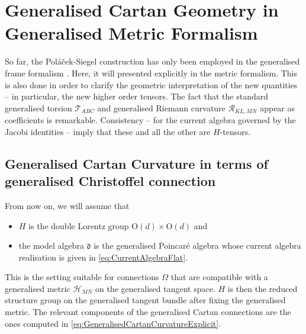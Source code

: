\documentclass[11pt,a4paper]{article}
\numberwithin{equation}{section}
\begin{document}
\section{Generalised Cartan Geometry in Generalised Metric Formalism}\label{chap:genMetricFormalism}

So far, the Poláček-Siegel construction has only been employed in the generalised frame formalism \cite{Polacek:2013nla,Butter:2021dtu,Butter:2022iza}. Here, it will presented explicitly in the metric formalism. This is also done in order to clarify the geometric interpretation of the new quantities -- in particular, the new higher order tensors. The fact that the standard generalised torsion $\mathcal{T}_{ABC}$ and generalised Riemann curvature $\mathcal{R}_{KL,MN}$ appear as coefficients is remarkable. Consistency -- for the current algebra governed by the Jacobi identities -- imply that these and all the other are $H$-tensors.

\subsection{Generalised Cartan Curvature in terms of generalised Christoffel connection} \label{chap:GeneralisedMetric}

From now on, we will assume that
\begin{itemize}
    \item $H$ is the double Lorentz group O$(d) \times$O$(d)$ and
    \item the model algebra $\mathfrak{d}$ is the generalised Poincar\'e algebra whose current algebra realisation is given in \eqref{eq:CurrentAlgebraFlat}.
\end{itemize}
This is the setting suitable for connections $\Omega$ that are compatible with a generalised metric $\mathcal{H}_{MN}$ on the generalised tangent space. $H$ is then the reduced structure group on the generalised tangent bundle after fixing the generalised metric. The relevant components of the generalised Cartan connections are the ones computed in \eqref{eq:GeneralisedCartanCurvatureExplicit}.
\end{document}
